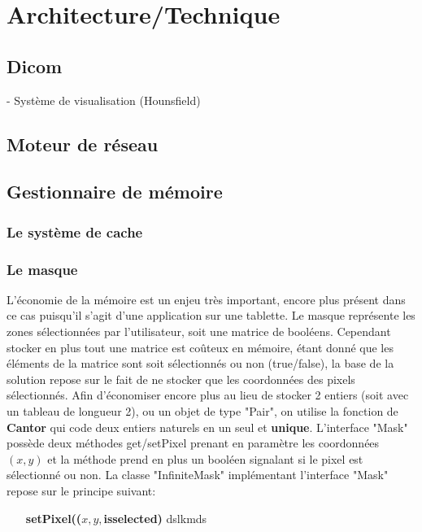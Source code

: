 \chapter{Architecture/Technique}


\section{Dicom}

- Système de visualisation (Hounsfield)

\section{Moteur de réseau}

\section{Gestionnaire de mémoire}
\subsection{Le système de cache}

\subsection{Le masque}
L'économie de la mémoire est un enjeu très important, encore plus présent dans ce cas
puisqu'il s'agit d'une application sur une tablette. Le masque représente les zones sélectionnées
par l'utilisateur, soit une matrice de booléens. Cependant stocker en plus tout une matrice est coûteux en mémoire,
étant donné que les éléments de la matrice sont soit sélectionnés ou non (true/false), la base de la solution repose sur le fait
de ne stocker que les coordonnées des pixels sélectionnés. Afin d'économiser encore plus au lieu de stocker 2 entiers (soit avec un tableau de longueur 2),
ou un objet de type "Pair", on utilise la fonction de \textbf{Cantor} qui code deux entiers naturels en un seul et \textbf{unique}.
L'interface "Mask" possède deux méthodes get/setPixel prenant en paramètre les coordonnées $(x,y)$ et la méthode prend en plus un booléen signalant
si le pixel est sélectionné ou non.
La classe "InfiniteMask" implémentant l'interface  "Mask" repose sur le principe suivant:
\begin{itemize}
\item[\textbf{setPixel(($x,y,$isselected)}] dslkmds
\end{itemize}
